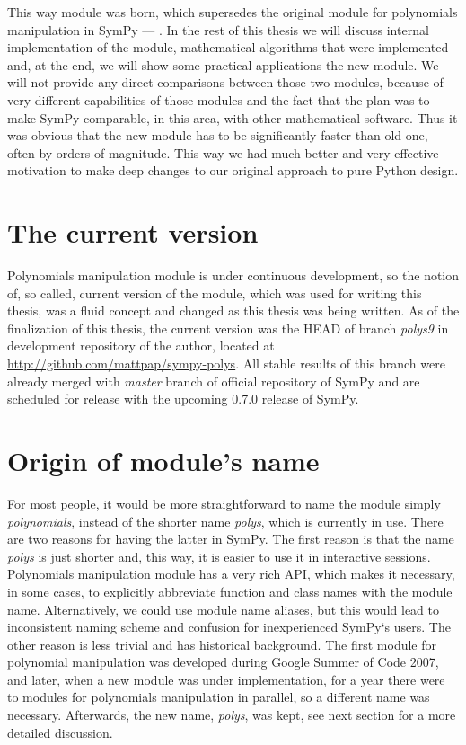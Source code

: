 This way  module was born, which supersedes the original module for polynomials
manipulation in SymPy --- . In the rest of this thesis we will discuss
internal implementation of the module, mathematical algorithms that were implemented and, at
the end, we will show some practical applications the new module. We will not provide any direct
comparisons between those two modules, because of very different capabilities of those modules
and the fact that the plan was to make SymPy comparable, in this area, with other mathematical
software. Thus it was obvious that the new module has to be significantly faster than old one,
often by orders of magnitude. This way we had much better and very effective motivation to make
deep changes to our original approach to pure Python design.


\section{The current version}

Polynomials manipulation module is under continuous development, so the notion of, so called, current
version of the module, which was used for writing this thesis, was a fluid concept and changed as this
thesis was being written. As of the finalization of this thesis, the current version was the HEAD of
branch \emph{polys9} in development repository of the author, located at \href{http://github.com/mattpap/sympy-polys}{http://github.com/mattpap/sympy-polys}.
All stable results of this branch were already merged with \emph{master} branch of official repository of
SymPy and are scheduled for release with the upcoming 0.7.0 release of SymPy.


\section{Origin of module's name}

For most people, it would be more straightforward to name the module simply \emph{polynomials}, instead
of the shorter name \emph{polys}, which is currently in use. There are two reasons for having the latter
in SymPy. The first reason is that the name \emph{polys} is just shorter and, this way, it is easier to
use it in interactive sessions. Polynomials manipulation module has a very rich API, which makes it
necessary, in some cases, to explicitly abbreviate function and class names with the module name.
Alternatively, we could use module name aliases, but this would lead to inconsistent naming scheme
and confusion for inexperienced SymPy`s users. The other reason is less trivial and has historical
background. The first module for polynomial manipulation was developed during Google Summer of Code
2007, and later, when a new module was under implementation, for a year there were to modules for
polynomials manipulation in parallel, so a different name was necessary. Afterwards, the new name,
\emph{polys}, was kept, see next section for a more detailed discussion.


